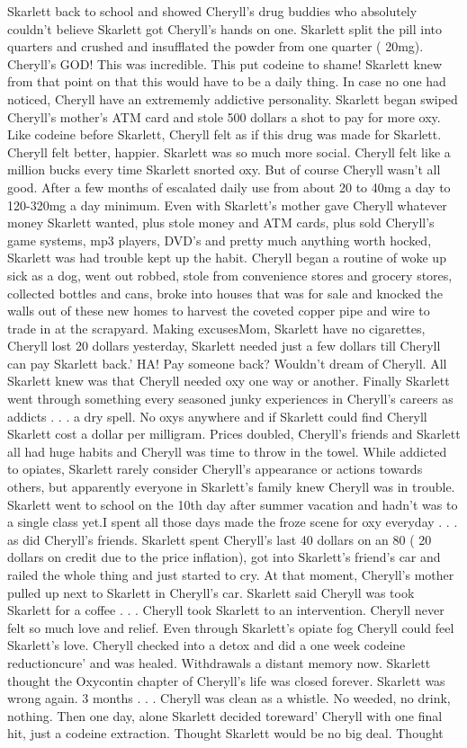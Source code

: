 \documentclass[12pt]{book}
\begin{document}
Skarlett back to school and showed Cheryll's drug buddies who absolutely couldn't believe Skarlett got Cheryll's hands on one. Skarlett split the pill into quarters and crushed and insufflated the powder from one quarter ( 20mg). Cheryll's GOD! This was incredible. This put codeine to shame! Skarlett knew from that point on that this would have to be a daily thing. In case no one had noticed, Cheryll have an extrememly addictive personality. Skarlett began swiped Cheryll's mother's ATM card and stole 500 dollars a shot to pay for more oxy. Like codeine before Skarlett, Cheryll felt as if this drug was made for Skarlett. Cheryll felt better, happier. Skarlett was so much more social. Cheryll felt like a million bucks every time Skarlett snorted oxy. But of course Cheryll wasn't all good. After a few months of escalated daily use from about 20 to 40mg a day to 120-320mg a day minimum. Even with Skarlett's mother gave Cheryll whatever money Skarlett wanted, plus stole money and ATM cards, plus sold Cheryll's game systems, mp3 players, DVD's and pretty much anything worth hocked, Skarlett was had trouble kept up the habit. Cheryll began a routine of woke up sick as a dog, went out robbed, stole from convenience stores and grocery stores, collected bottles and cans, broke into houses that was for sale and knocked the walls out of these new homes to harvest the coveted copper pipe and wire to trade in at the scrapyard. Making excusesMom, Skarlett have no cigarettes, Cheryll lost 20 dollars yesterday, Skarlett needed just a few dollars till Cheryll can pay Skarlett back.' HA! Pay someone back? Wouldn't dream of Cheryll. All Skarlett knew was that Cheryll needed oxy one way or another. Finally Skarlett went through something every seasoned junky experiences in Cheryll's careers as addicts . . .  a dry spell. No oxys anywhere and if Skarlett could find Cheryll Skarlett cost a dollar per milligram. Prices doubled, Cheryll's friends and Skarlett all had huge habits and Cheryll was time to throw in the towel. While addicted to opiates, Skarlett rarely consider Cheryll's appearance or actions towards others, but apparently everyone in Skarlett's family knew Cheryll was in trouble. Skarlett went to school on the 10th day after summer vacation and hadn't was to a single class yet.I spent all those days made the froze scene for oxy everyday . . .  as did Cheryll's friends. Skarlett spent Cheryll's last 40 dollars on an 80 ( 20 dollars on credit due to the price inflation), got into Skarlett's friend's car and railed the whole thing and just started to cry. At that moment, Cheryll's mother pulled up next to Skarlett in Cheryll's car. Skarlett said Cheryll was took Skarlett for a coffee . . .  Cheryll took Skarlett to an intervention. Cheryll never felt so much love and relief. Even through Skarlett's opiate fog Cheryll could feel Skarlett's love. Cheryll checked into a detox and did a one week codeine reductioncure' and was healed. Withdrawals a distant memory now. Skarlett thought the Oxycontin chapter of Cheryll's life was closed forever. Skarlett was wrong again. 3 months . . .  Cheryll was clean as a whistle. No weeded, no drink, nothing. Then one day, alone Skarlett decided toreward' Cheryll with one final hit, just a codeine extraction. Thought Skarlett would be no big deal. Thought 
\end{document}
